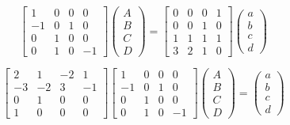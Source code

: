 \documentclass[a5paper,12pt]{article}
\begin{document}
\begin{equation}
\left[ \begin{matrix}
1 & 0 & 0 & 0 \\
-1 & 0 & 1 & 0 \\
0 & 1 & 0 & 0 \\
0 & 1 & 0 & -1 
\end{matrix} \right]
\left( \begin{matrix} A \\ B\\ C \\D\end{matrix}\right) = \left[ \begin{matrix}
0 & 0 & 0 & 1 \\
0 & 0 & 1 & 0 \\
1 & 1 & 1 & 1 \\
3 & 2 & 1 & 0 
\end{matrix} \right]
\left( \begin{matrix} a \\ b\\ c \\d\end{matrix}\right)
\end{equation}

\begin{equation}
\left[ \begin{matrix}
2 & 1 & -2 & 1 \\
-3 & -2 & 3 & -1 \\
0 & 1 & 0 & 0 \\
1 & 0 & 0 & 0 
\end{matrix} \right]
\left[ \begin{matrix}
1 & 0 & 0 & 0 \\
-1 & 0 & 1 & 0 \\
0 & 1 & 0 & 0 \\
0 & 1 & 0 & -1 
\end{matrix} \right]
\left( \begin{matrix} A \\ B\\ C \\D\end{matrix}\right) = 
\left( \begin{matrix} a \\ b\\ c \\d\end{matrix}\right)
\end{equation}
\end{document}

